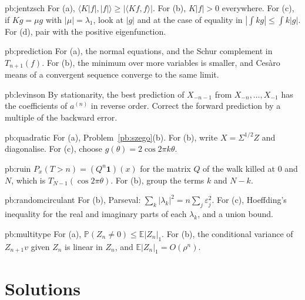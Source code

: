 \begin{hint}{pb:jentzsch}
For (a), $\langle K|f|,|f|\rangle\ge|\langle Kf,f\rangle|$. For (b), $K|f|>0$ everywhere. For (c), if $Kg=\mu g$ with $|\mu|=\lambda_1$, look at $|g|$ and at the case of equality in
$|\int kg|\le\int k|g|$. For (d), pair with the positive eigenfunction.
\end{hint}

\begin{hint}{pb:prediction}
For (a), the normal equations, and the Schur complement in $T_{n+1}(f)$. For (b), the minimum over more variables is smaller, and Cesàro means of a convergent sequence converge to the same
limit.
\end{hint}

\begin{hint}{pb:levinson}
By stationarity, the best prediction of $X_{-n-1}$ from $X_{-n},\dots,X_{-1}$ has the coefficients of $a^{(n)}$ in reverse order. Correct the forward prediction by a multiple of the backward
error.
\end{hint}

\begin{hint}{pb:quadratic}
For (a), Problem~\ref{pb:szego}(b). For (b), write $X=\Sigma^{1/2}Z$ and diagonalise. For (c), choose $g(\theta)=2\cos2\pi k\theta$.
\end{hint}

\begin{hint}{pb:ruin}
$P_x(T>n)=(Q^n\mathbf 1)(x)$ for the matrix $Q$ of the walk killed at $0$ and $N$, which is $T_{N-1}(\cos2\pi\theta)$. For (b), group the terms $k$ and $N-k$.
\end{hint}

\begin{hint}{pb:randomcirculant}
For (b), Parseval: $\sum_k|\lambda_k|^2=n\sum_j\varepsilon_j^2$. For (c), Hoeffding's inequality for the real and imaginary parts of each $\lambda_k$, and a union bound.
\end{hint}

\begin{hint}{pb:multitype}
For (a), $\mathbb P(Z_n\ne0)\le\mathbb E|Z_n|_1$. For (b), the conditional variance of $Z_{n+1}v$ given $Z_n$ is linear in $Z_n$, and $\mathbb E|Z_n|_1=O(\rho^n)$.
\end{hint}

\section*{Solutions}

